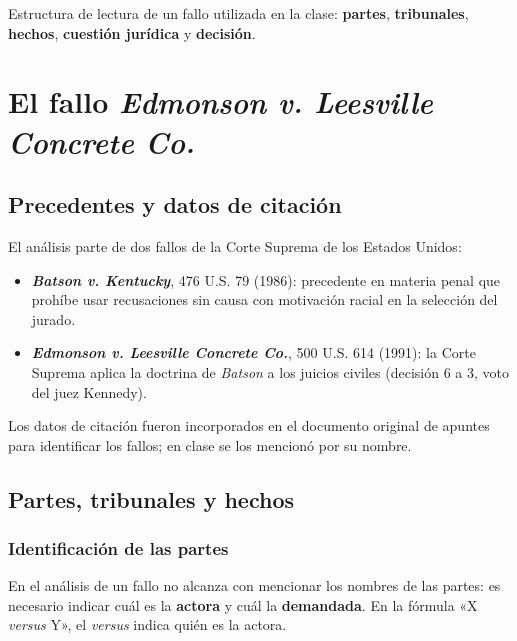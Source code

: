 \documentclass[12pt,oneside]{book}
\begin{document}
\begin{note}
Estructura de lectura de un fallo utilizada en la clase: \textbf{partes}, \textbf{tribunales}, \textbf{hechos}, \textbf{cuestión jurídica} y \textbf{decisión}.
\end{note}

\chapter[El fallo \textit{Edmonson}]{El fallo \textit{Edmonson v. Leesville Concrete Co.}}

\section{Precedentes y datos de citación}

El análisis parte de dos fallos de la Corte Suprema de los Estados Unidos:

\begin{itemize}
    \item \textbf{\textit{Batson v. Kentucky}}, 476 U.S. 79 (1986): precedente en materia penal que prohíbe usar recusaciones sin causa con motivación racial en la selección del jurado.
    \item \textbf{\textit{Edmonson v. Leesville Concrete Co.}}, 500 U.S. 614 (1991): la Corte Suprema aplica la doctrina de \textit{Batson} a los juicios civiles (decisión 6 a 3, voto del juez Kennedy).
\end{itemize}

\begin{note}
Los datos de citación fueron incorporados en el documento original de apuntes para identificar los fallos; en clase se los mencionó por su nombre.
\end{note}

\section{Partes, tribunales y hechos}

\subsection{Identificación de las partes}

En el análisis de un fallo no alcanza con mencionar los nombres de las partes: es necesario indicar cuál es la \textbf{actora} y cuál la \textbf{demandada}. En la fórmula «X \textit{versus} Y», el \textit{versus} indica quién es la actora.
\end{document}
